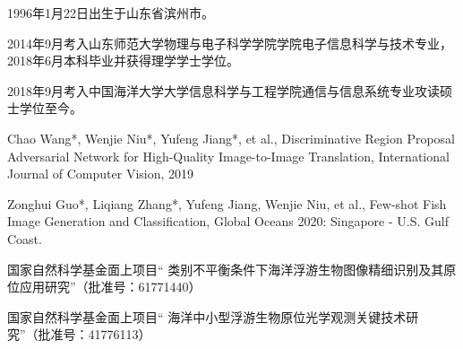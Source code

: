 \begin{resume}


  1996年1月22日出生于山东省滨州市。

  2014年9月考入山东师范大学物理与电子科学学院学院电子信息科学与技术专业，2018年6月本科毕业并获得理学学士学位。
  
  2018年9月考入中国海洋大学大学信息科学与工程学院通信与信息系统专业攻读硕士学位至今。


  \begin{publications}
    \item Chao Wang*, Wenjie Niu*, Yufeng Jiang*, et al., Discriminative Region Proposal Adversarial Network for High-Quality Image-to-Image Translation, International Journal of Computer Vision, 2019
    \item Zonghui Guo*, Liqiang Zhang*, Yufeng Jiang, Wenjie Niu, et al., Few-shot Fish Image Generation and Classification, Global Oceans 2020: Singapore - U.S. Gulf Coast.
  \end{publications}


  \begin{achievements}
    \item 国家自然科学基金面上项目“ 类别不平衡条件下海洋浮游生物图像精细识别及其原位应用研究”（批准号：61771440）
    \item 国家自然科学基金面上项目“ 海洋中小型浮游生物原位光学观测关键技术研究”（批准号：41776113）

  \end{achievements}

\end{resume}
